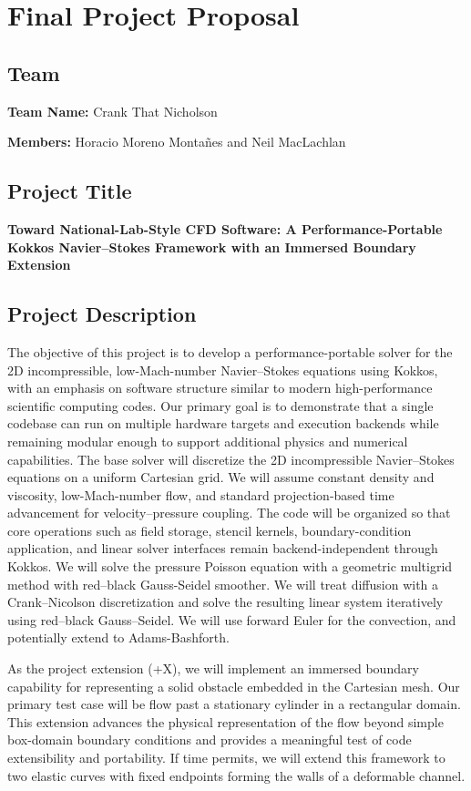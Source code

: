 
\section*{Final Project Proposal}

\subsection*{Team}

\noindent \textbf{Team Name:} Crank That Nicholson

\noindent \textbf{Members:} Horacio Moreno Monta\~nes and Neil MacLachlan

\subsection*{Project Title}
\textbf{Toward National-Lab-Style CFD Software: A Performance-Portable Kokkos Navier--Stokes Framework with an Immersed Boundary Extension}

\subsection*{Project Description}
The objective of this project is to develop a performance-portable solver for the 2D incompressible, low-Mach-number Navier--Stokes equations using Kokkos, with an emphasis on software structure similar to modern high-performance scientific computing codes.
Our primary goal is to demonstrate that a single codebase can run on multiple hardware targets and execution backends while remaining modular enough to support additional physics and numerical capabilities.
The base solver will discretize the 2D incompressible Navier--Stokes equations on a uniform Cartesian grid. 
We will assume constant density and viscosity, low-Mach-number flow, and standard projection-based time advancement for velocity--pressure coupling.
The code will be organized so that core operations such as field storage, stencil kernels, boundary-condition application, and linear solver interfaces remain backend-independent through Kokkos. We will solve the pressure Poisson equation
with a geometric multigrid method with red--black Gauss-Seidel smoother. We will treat diffusion with a Crank--Nicolson discretization and solve the resulting linear system iteratively using red--black Gauss--Seidel. We will use forward Euler for the convection, and potentially
extend to Adams-Bashforth. 

As the project extension (+X), we will implement an immersed boundary capability for representing a solid obstacle embedded in the Cartesian mesh. 
Our primary test case will be flow past a stationary cylinder in a rectangular domain.
This extension advances the physical representation of the flow beyond simple box-domain boundary conditions and provides a meaningful test of code extensibility and portability.
If time permits, we will extend this framework to two elastic curves with fixed endpoints forming the walls of a deformable channel.

